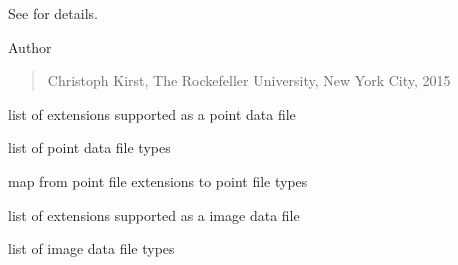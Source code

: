 \documentclass[letterpaper,10pt,english]{sphinxmanual}
\begin{document}
See {\hyperref[api/ClearMap.IO:module-ClearMap.IO]{\emph{}}} for details.

Author
\begin{quote}

Christoph Kirst, The Rockefeller University, New York City, 2015
\end{quote}

\begin{fulllineitems}
\label{api/ClearMap.IO:ClearMap.IO.IO.pointFileExtensions}
list of extensions supported as a point data file

\end{fulllineitems}


\begin{fulllineitems}
\label{api/ClearMap.IO:ClearMap.IO.IO.pointFileTypes}
list of point data file types

\end{fulllineitems}


\begin{fulllineitems}
\label{api/ClearMap.IO:ClearMap.IO.IO.pointFileExtensionToType}
map from point file extensions to point file types

\end{fulllineitems}


\begin{fulllineitems}
\label{api/ClearMap.IO:ClearMap.IO.IO.dataFileExtensions}
list of extensions supported as a image data file

\end{fulllineitems}


\begin{fulllineitems}
\label{api/ClearMap.IO:ClearMap.IO.IO.dataFileTypes}
list of image data file types

\end{fulllineitems}
\end{document}
